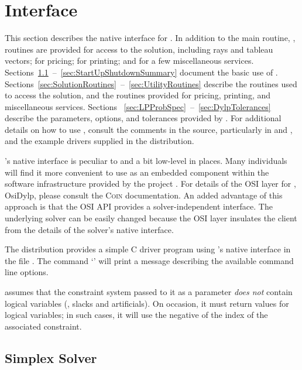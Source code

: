 \section{\dylp Interface}
\label{sec:DylpInterface}

This section describes the native interface for \dylp.
In addition to the main routine, , routines are provided
for access to the solution, including rays and tableau vectors; for pricing; 
for printing; and for a few miscellaneous services.
Sections~\ref{sec:SimplexSolver}~--~\ref{sec:StartUpShutdownSummary} document
the basic use of \dylp.
Sections~\ref{sec:SolutionRoutines}~--~\ref{sec:UtilityRoutines} describe the
routines used to access the solution, and the routines provided for pricing,
printing, and miscellaneous services.
Sections ~\ref{sec:LPProbSpec}~--~\ref{sec:DylpTolerances} describe the
parameters, options, and tolerances provided by \dylp.
For additional details on how to use \dylp, consult the comments
in the source, particularly in  and ,
and the example drivers supplied in the distribution.

\dylp's native interface is peculiar to \dylp and a bit low-level in places.
Many individuals will find it more convenient to use \dylp as an
embedded component within the software infrastructure provided by
the \coin project \cite{COIN}.
For details of the \coin OSI layer for \dylp, OsiDylp, please consult
the \textsc{Coin}
documentation.
An added advantage of this approach is that the OSI API provides
a solver-independent interface.
The underlying solver can be easily changed because the OSI layer
insulates
the client from the details of the solver's native interface.

The \dylp distribution provides a simple C driver program using \dylp's
native interface in the file .
The command `' will print a message describing the
available command line options.

\dylp assumes that the constraint system passed to it as a parameter
\textit{does not} contain logical variables (\ie, slacks and artificials).
On occasion, it must return values for logical variables; in such cases,
it will use the negative of the index of the associated constraint.

\subsection{Simplex Solver}
\label{sec:SimplexSolver}

